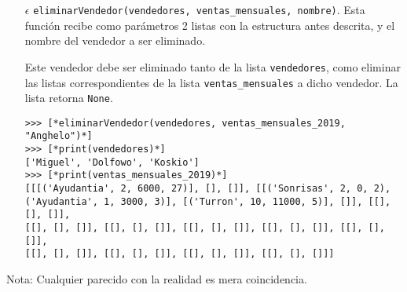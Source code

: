 \begin{enumerate}
    
    \item[$\epsilon$] \texttt{eliminarVendedor(vendedores, ventas\_mensuales, nombre)}. Esta función recibe como parámetros 2 listas con la estructura antes descrita, y el nombre del vendedor a ser eliminado. 
    
    Este vendedor debe ser eliminado tanto de la lista \texttt{vendedores}, como eliminar las listas correspondientes de la lista \texttt{ventas\_mensuales} a dicho vendedor. La lista retorna \texttt{None}.

\begin{lstlisting}[style=consola]
>>> [*eliminarVendedor(vendedores, ventas_mensuales_2019, "Anghelo")*]
>>> [*print(vendedores)*]
['Miguel', 'Dolfowo', 'Koskio']
>>> [*print(ventas_mensuales_2019)*]
[[[('Ayudantia', 2, 6000, 27)], [], []], [[('Sonrisas', 2, 0, 2),
('Ayudantia', 1, 3000, 3)], [('Turron', 10, 11000, 5)], []], [[], [], []],
[[], [], []], [[], [], []], [[], [], []], [[], [], []], [[], [], []],
[[], [], []], [[], [], []], [[], [], []], [[], [], []]]
\end{lstlisting}

\end{enumerate}


Nota: Cualquier parecido con la realidad es mera coincidencia.
